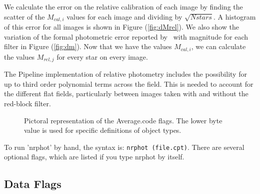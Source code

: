 \documentclass{article}
\begin{document}
        We calculate the error on the relative calibration of each
image by finding the scatter of the $M_{cal,i}$ values for each image
and dividing by $\sqrt{N stars}$.  A histogram of this error for all
images is shown in Figure (\ref{fig:dMrel}).  We also show the
variation of the formal photometric error reported by \dophot\ with
magnitude for each filter in Figure (\ref{fig:dm}).  Now that we have
the values $M_{cal,i}$, we can calculate the values $M_{rel,j}$ for
every star on every image.

The Pipeline implementation of relative photometry includes the
possibility for up to third order polynomial terms across the field.
This is needed to account for the different flat fields, particularly
between images taken with and without the red-block filter.  

\begin{figure}
\caption{\label{flags} \small
  Pictoral representation of the Average.code flags.  The lower byte
  value is used for specific definitions of object types.  }
\end{figure}

To run 'nrphot' by hand, the syntax is: {\tt nrphot (file.cpt)}.
There are several optional flags, which are listed if you type
nrphot by itself.

\subsection{Data Flags}
\end{document}
